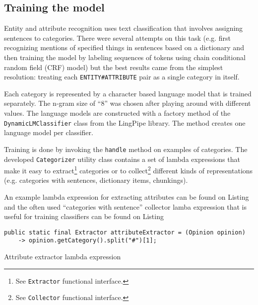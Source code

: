 
\subsection*{Training the model}
Entity and attribute recognition uses text classification that involves
assigning sentences to categories. There were several attempts on this task
(e.g. first recognizing mentions of specified things in sentences based on a
dictionary and then training the model by labeling sequences of tokens using
chain conditional random field (CRF) model) but the best results came from the
simplest resolution: treating each \verb|ENTITY#ATTRIBUTE| pair as a single
category in itself.

Each category is represented by a character based language model that is
trained separately. The n-gram size of ``8'' was chosen after playing around with
different values. The language models are constructed with a factory method
of the \verb|DynamicLMClassifier| class from the LingPipe library. The method
creates one language model per classifier.

Training is done by invoking the \verb|handle| method on examples of categories.
The developed \verb|Categorizer| utility class contains a set of lambda
expressions that make it easy to extract\footnote{See \verb+Extractor+ functional
interface.} categories or to collect\footnote{See \verb+Collector+ functional
interface.} different kinds of representations (e.g. categories with sentences,
dictionary items, chunkings).

An example lambda expression for extracting attributes can be found on Listing
 and the often used ``categories with sentence''
collector lamba expression that is useful for training classifiers can be found
on Listing 

\begin{listing}
\begin{verbatim}
public static final Extractor attributeExtractor = (Opinion opinion)
    -> opinion.getCategory().split("#")[1];
\end{verbatim}
\caption{Attribute extractor lambda expression}
\label{listing:attributeExtractor}
\end{listing}

